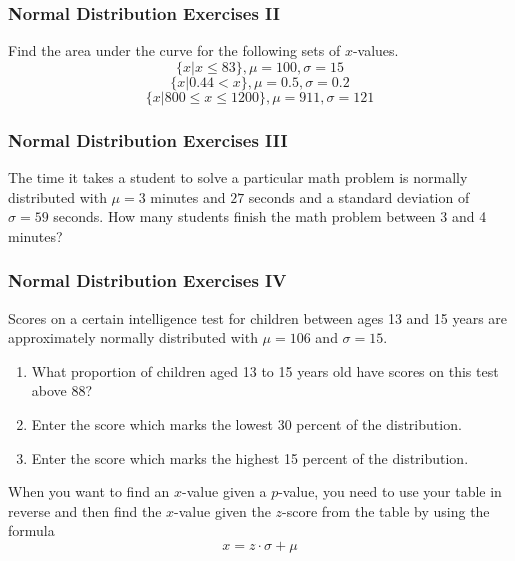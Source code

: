 \documentclass[xcolor=dvipsnames]{beamer}
\begin{document}
\begin{frame}
  \frametitle{Normal Distribution Exercises II}
{\ubung} Find the area under the curve for the
following sets of $x$-values. 
\begin{equation}
  \label{eq:aequaixe}
\{x|x\leq{}83\},\mu=100,\sigma=15
\end{equation}
\begin{equation}
  \label{eq:oocohdau}
\{x|0.44<x\},\mu=0.5,\sigma=0.2  
\end{equation}
\begin{equation}
  \label{eq:aethohph}
\{x|800\leq{}x\leq{}1200\},\mu=911,\sigma=121
\end{equation}
\end{frame}

\begin{frame}
  \frametitle{Normal Distribution Exercises III}
{\ubung} The time it takes a student to solve a particular math problem is
normally distributed with $\mu=3$ minutes and $27$ seconds and a
standard deviation of $\sigma=59$ seconds. How many students finish
the math problem between 3 and 4 minutes?
\end{frame}

\begin{frame}
  \frametitle{Normal Distribution Exercises IV}
  {\ubung} Scores on a certain intelligence test for children between
  ages 13 and 15 years are approximately normally distributed with
  $\mu=106$ and $\sigma=15$.
  \begin{enumerate}
  \item What proportion of children aged 13 to 15 years old have
    scores on this test above 88?
  \item Enter the score which marks the lowest 30 percent of the
    distribution.
  \item Enter the score which marks the highest 15 percent of the
    distribution.
  \end{enumerate}
When you want to find an $x$-value given a $p$-value, you need to use
your table in reverse and then find the $x$-value given the $z$-score
from the table by using the formula
\begin{equation}
  \label{eq:aedecaba}
  x=z\cdot\sigma+\mu
\end{equation}
\end{frame}
\end{document}
